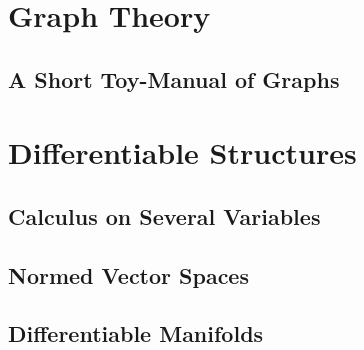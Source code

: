\part{Graph Theory}

\chapter{A Short Toy-Manual of Graphs}







\part{Differentiable Structures}

\chapter{Calculus on Several Variables}







\chapter{Normed Vector Spaces}



\chapter{Differentiable Manifolds}




\backmatter

\printbibliography


